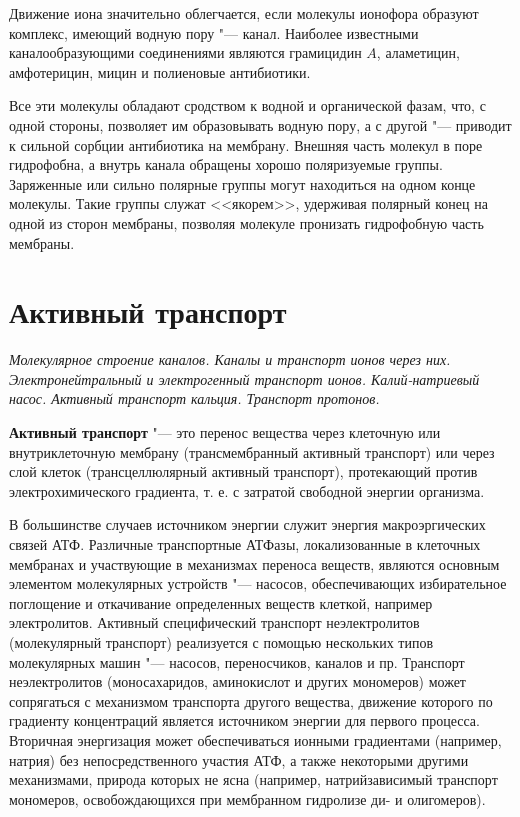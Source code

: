 \documentclass[12pt,a4paper,oneside]{book}
\begin{document}
Движение иона значительно облегчается, если молекулы ионофора образуют комплекс, имеющий водную пору "--- канал. Наиболее известными каналообразующими соединениями являются грамицидин $A$, аламетицин, амфотерицин, мицин и полиеновые антибиотики.

Все эти молекулы обладают сродством к водной и органической фазам, что, с одной стороны, позволяет им образовывать водную пору, а с другой "--- приводит к сильной сорбции антибиотика на мембрану. Внешняя часть молекул в поре гидрофобна, а внутрь канала обращены хорошо поляризуемые группы. Заряженные или сильно полярные группы могут находиться на одном конце молекулы. Такие группы служат <<якорем>>, удерживая полярный конец на одной из сторон мембраны, позволяя молекуле пронизать гидрофобную часть мембраны.


\newpage
\section{Активный транспорт}
{\it Молекулярное строение каналов. Каналы и транспорт ионов через них. Электронейтральный и электрогенный транспорт ионов. Калий-натриевый насос. Активный транспорт кальция. Транспорт протонов.}

{\bf Активный транспорт} "--- это перенос вещества через клеточную или внутриклеточную мембрану (трансмембранный активный транспорт) или через слой клеток (трансцеллюлярный активный транспорт), протекающий против электрохимического градиента, т. е. с затратой свободной энергии организма. 

В большинстве случаев источником энергии служит энергия макроэргических связей АТФ. Различные транспортные АТФазы, локализованные в клеточных мембранах и участвующие в механизмах переноса веществ, являются основным элементом молекулярных устройств "--- насосов, обеспечивающих избирательное поглощение и откачивание определенных веществ клеткой, например электролитов. Активный специфический транспорт неэлектролитов (молекулярный транспорт) реализуется с помощью нескольких типов молекулярных машин "--- насосов, переносчиков, каналов и пр. Транспорт неэлектролитов (моносахаридов, аминокислот и других мономеров) может сопрягаться с механизмом транспорта другого вещества, движение которого по градиенту концентраций является источником энергии для первого процесса. Вторичная энергизация может обеспечиваться ионными градиентами (например, натрия) без непосредственного участия АТФ, а также некоторыми другими механизмами, природа которых не ясна (например, натрийзависимый транспорт мономеров, освобождающихся при мембранном гидролизе ди- и олигомеров).
\end{document}
